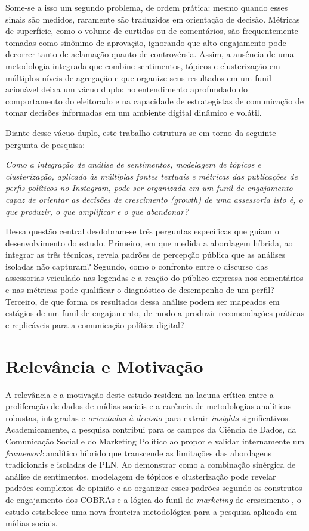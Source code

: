 Some-se a isso um segundo problema, de ordem prática: mesmo quando esses sinais são medidos, raramente são traduzidos em orientação de decisão. Métricas de superfície, como o volume de curtidas ou de comentários, são frequentemente tomadas como sinônimo de aprovação, ignorando que alto engajamento pode decorrer tanto de aclamação quanto de controvérsia. Assim, a ausência de uma metodologia integrada \textemdash{} que combine sentimentos, tópicos e clusterização em múltiplos níveis de agregação e que organize seus resultados em um funil acionável \textemdash{} deixa um vácuo duplo: no entendimento aprofundado do comportamento do eleitorado e na capacidade de estrategistas de comunicação de tomar decisões informadas em um ambiente digital dinâmico e volátil.

Diante desse vácuo duplo, este trabalho estrutura-se em torno da seguinte pergunta de pesquisa:

\noindent\emph{Como a integração de análise de sentimentos, modelagem de tópicos e clusterização, aplicada às múltiplas fontes textuais e métricas das publicações de perfis políticos no Instagram, pode ser organizada em um funil de engajamento capaz de orientar as decisões de crescimento (growth) de uma assessoria \textemdash{} isto é, o que produzir, o que amplificar e o que abandonar?}

Dessa questão central desdobram-se três perguntas específicas que guiam o desenvolvimento do estudo. Primeiro, em que medida a abordagem híbrida, ao integrar as três técnicas, revela padrões de percepção pública que as análises isoladas não capturam? Segundo, como o confronto entre o discurso das assessorias \textemdash{} veiculado nas legendas \textemdash{} e a reação do público \textemdash{} expressa nos comentários e nas métricas \textemdash{} pode qualificar o diagnóstico de desempenho de um perfil? Terceiro, de que forma os resultados dessa análise podem ser mapeados em estágios de um funil de engajamento, de modo a produzir recomendações práticas e replicáveis para a comunicação política digital?

\section{Relevância e Motivação}

A relevância e a motivação deste estudo residem na lacuna crítica entre a proliferação de dados de mídias sociais e a carência de metodologias analíticas robustas, integradas e \emph{orientadas à decisão} para extrair \emph{insights} significativos. Academicamente, a pesquisa contribui para os campos da Ciência de Dados, da Comunicação Social e do Marketing Político ao propor e validar internamente um \emph{framework} analítico híbrido que transcende as limitações das abordagens tradicionais e isoladas de PLN. Ao demonstrar como a combinação sinérgica de análise de sentimentos, modelagem de tópicos e clusterização pode revelar padrões complexos de opinião \textemdash{} e ao organizar esses padrões segundo os construtos de engajamento dos COBRAs \cite{muntinga2011} e a lógica do funil de \emph{marketing} de crescimento \cite{feroz2024} \textemdash{}, o estudo estabelece uma nova fronteira metodológica para a pesquisa aplicada em mídias sociais.

